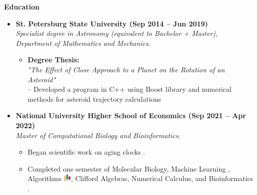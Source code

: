 \documentclass[12pt]{article}
\begin{document}
\vspace{1em}

\noindent \textbf{\Large Education}
\begin{itemize}
    \item \textbf{St. Petersburg State University (Sep 2014 -- Jun 2019)}\\
          \textit{Specialist degree in Astronomy (equivalent to Bachelor + Master), Department of Mathematics and Mechanics.}
          \begin{itemize}
              \item \textbf{Degree Thesis:} \\
                    \textit{"The Effect of Close Approach to a Planet on the Rotation of an Asteroid"} \\
                    -- Developed a program in C++ using Boost library and numerical methods for asteroid trajectory calculations \href{https://github.com/eluator/dipvlom}{\faGithub}
          \end{itemize}

\item \textbf{National University Higher School of Economics (Sep 2021 -- Apr 2022)}\\
          \textit{Master of Computational Biology and Bioinformatics.}
          \begin{itemize}
              \item Began scientific work on aging clocks \href{https://github.com/eluator/ResearchBioinf}{\faGithub}.
              \item Completed one semester of Molecular Biology, Machine Learning \href{https://github.com/eluator/HSE.machine_learning}{\faGithub}, Algorithms \href{https://codeforces.com/submissions/IgorTimofeev}{\includegraphics[height=1em]{codeforces-logo.png}}, Clifford Algebras, Numerical Calculus, and Bioinformatics \href{https://docs.google.com/presentation/d/1sv9-xaUu5Gb0dyn8ib7BOasO3S-FE03ZiIHD2kDEqIU/edit?usp=sharing}{\faChalkboardTeacher}.
          \end{itemize}
\end{itemize}

\vspace{1em}
\end{document}
